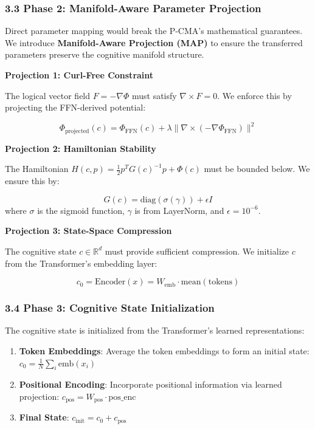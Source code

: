 \documentclass[
  11pt,
  a4paper,
]{article}
\begin{document}
\subsubsection{3.3 Phase 2: Manifold-Aware Parameter
Projection}\label{phase-2-manifold-aware-parameter-projection}

Direct parameter mapping would break the P-CMA's mathematical
guarantees. We introduce \textbf{Manifold-Aware Projection (MAP)} to
ensure the transferred parameters preserve the cognitive manifold
structure.

\textbf{Projection 1: Curl-Free Constraint}

The logical vector field \(F = -\nabla\Phi\) must satisfy
\(\nabla \times F = 0\). We enforce this by projecting the FFN-derived
potential:

\[
\Phi_{\text{projected}}(c) = \Phi_{\text{FFN}}(c) + \lambda \|\nabla \times (-\nabla\Phi_{\text{FFN}})\|^2
\]

\textbf{Projection 2: Hamiltonian Stability}

The Hamiltonian \(H(c,p) = \frac{1}{2}p^T G(c)^{-1}p + \Phi(c)\) must be
bounded below. We ensure this by:

\[
G(c) = \text{diag}(\sigma(\gamma)) + \epsilon I
\] where \(\sigma\) is the sigmoid function, \(\gamma\) is from
LayerNorm, and \(\epsilon = 10^{-6}\).

\textbf{Projection 3: State-Space Compression}

The cognitive state \(c \in \mathbb{R}^d\) must provide sufficient
compression. We initialize \(c\) from the Transformer's embedding layer:

\[
c_0 = \text{Encoder}(x) = W_{\text{emb}} \cdot \text{mean}(\text{tokens})
\]

\subsubsection{3.4 Phase 3: Cognitive State
Initialization}\label{phase-3-cognitive-state-initialization}

The cognitive state is initialized from the Transformer's learned
representations:

\begin{enumerate}
\def\labelenumi{\arabic{enumi}.}
\item
  \textbf{Token Embeddings}: Average the token embeddings to form an
  initial state: \(c_0 = \frac{1}{N} \sum_i \text{emb}(x_i)\)
\item
  \textbf{Positional Encoding}: Incorporate positional information via
  learned projection:
  \(c_{\text{pos}} = W_{\text{pos}} \cdot \text{pos\_enc}\)
\item
  \textbf{Final State}: \(c_{\text{init}} = c_0 + c_{\text{pos}}\)
\end{enumerate}
\end{document}
